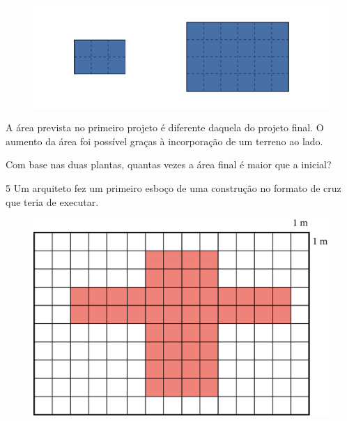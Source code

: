 \begin{figure}[htpb!]
\centering
\includegraphics[width=\textwidth]{media/image30.png}
\end{figure}

A área prevista no primeiro projeto é diferente daquela do projeto final.
O aumento da área foi possível graças à incorporação de um terreno ao lado.

Com base nas duas plantas, quantas vezes a área final é maior que a inicial?


\pagebreak

\num{5} Um arquiteto fez um primeiro esboço de uma construção no formato de cruz
que teria de executar.

\begin{figure}[htpb!]
\centering
\includegraphics[width=\textwidth]{media/image32.png}
\end{figure}

